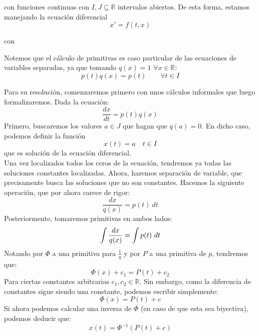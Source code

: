 con funciones
continuas con $I,J\subseteq \mathbb{R}$ intervalos abiertos. De esta forma, estamos manejando la ecuación diferencial
\begin{equation*}
    x' = f(t,x)
\end{equation*}

con

\begin{observacion}
Notemos que el cálculo de primitivas es caso particular de las ecuaciones de variables separadas, ya que tomando $q(x) = 1$ $\forall x\in \mathbb{R}$:
\begin{equation*}
    p(t)q(x) = p(t) \qquad \forall t\in I
\end{equation*}
\end{observacion}
Para su resolución, comenzaremos primero con unos cálculos informales que luego formalizaremos. Dada la ecuación:
\begin{equation*}
    \dfrac{dx}{dt} = p(t)q(x)
\end{equation*}
Primero, buscaremos los valores $a\in J$ que hagan que $q(a) = 0$. En dicho caso, podemos definir la función
\begin{equation*}
    x(t) = a \quad t\in I
\end{equation*}
que es solución de la ecuación diferencial. \\

Una vez localizados todos los ceros de la ecuación, tendremos ya todas las soluciones constantes localizadas. Ahora, haremos separación de variable, que precisamente busca las soluciones que no son constantes. Hacemos la siguiente operación, que por ahora carece de rigor:
\begin{equation*}
    \dfrac{dx}{q(x)} = p(t)~dt
\end{equation*}
Posteriormente, tomaremos primitivas en ambos lados:
\begin{equation*}
    \int\dfrac{dx}{q(x)} = \int p(t)~dt \\
\end{equation*}
Notando por $\Phi$ a una primitiva para $\frac{1}{q}$ y por $P$ a una primitiva de $p$, tendremos que:
\begin{equation*}
    \Phi(x)+c_1 = P(t) + c_2
\end{equation*}
Para ciertas constantes arbitrarias $c_1,c_2\in \mathbb{R}$. Sin embargo, como la diferencia de constantes sigue siendo una constante, podemos escribir simplemente:
\begin{equation*}
    \Phi(x)= P(t) + c
\end{equation*}
Si ahora podemos calcular una inversa de $\Phi$ (en caso de que esta sea biyectiva), podemos deducir que:
\begin{equation*}
    x(t) = \Phi^{-1}(P(t)+c)
\end{equation*}

